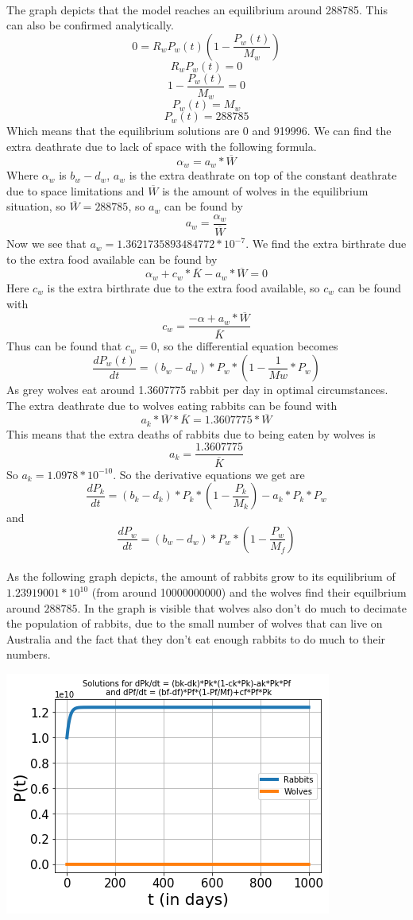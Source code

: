 \documentclass{article}
\begin{document}
\\
The graph depicts that the model reaches an equilibrium around 288785. This can also be confirmed analytically. 
$$0=R_wP_w(t)(1-\frac{P_w(t)}{M_w})$$
$$R_wP_w(t)=0$$
$$1-\frac{P_w(t)}{M_w}=0$$
$$P_w(t)=M_w$$
$$P_w(t)=288785$$
Which means that the equilibrium solutions are 0 and 919996. We can find the extra deathrate due to lack of space with the following formula.
$$\alpha_w = a_w*\overline{W}$$
Where $\alpha_w$ is $b_w-d_w$, $a_w$ is the extra deathrate on top of the constant deathrate due to space limitations and $\overline{W}$ is the amount of wolves in the equilibrium situation, so $\overline{W}=288785$, so $a_w$ can be found by
$$a_w = \frac{\alpha_w}{\overline{W}}$$
Now we see that $a_w=1.3621735893484772*10^{-7}$. We find the extra birthrate due to the extra food available can be found by
$$\alpha_w + c_w*\overline{K}-a_w*\overline{W}=0$$
Here $c_w$ is the extra birthrate due to the extra food available, so $c_w$ can be found with
$$c_w=\frac{-\alpha+a_w*\overline{W}}{\overline{K}}$$
Thus can be found that $c_w=0$, so the differential equation becomes
$$\frac{dP_w(t)}{dt}=(b_w-d_w)*P_w*(1-\frac{1}{Mw}*P_w)$$
As grey wolves eat around 1.3607775 rabbit per day in optimal circumstances. The extra deathrate due to wolves eating rabbits can be found with
$$a_k*\overline{W}*\overline{K}=1.3607775*\overline{W}$$
This means that the extra deaths of rabbits due to being eaten by wolves is 
$$a_k=\frac{1.3607775}{\overline{K}}$$
So $a_k=1.0978*10^{-10}$. So the derivative equations we get are
$$\frac{dP_k}{dt}=(b_k-d_k)*P_k*(1-\frac{P_k}{M_k})-a_k*P_k*P_w$$
and 
$$\frac{dP_w}{dt}=(b_w-d_w)*P_w*(1-\frac{P_w}{M_f})$$
\\As the following graph depicts, the amount of rabbits grow to its equilibrium of $1.23919001*10^{10}$ (from around 10000000000) and the wolves find their equilbrium around $288785$. In the graph is visible that wolves also don't do much to decimate the population of rabbits, due to the small number of wolves that can live on Australia and the fact that they don't eat enough rabbits to do much to their numbers.
\begin{center}
    \includegraphics[scale=0.78]{Pictures/RabbitWolves.png}
\end{center}
\end{document}
